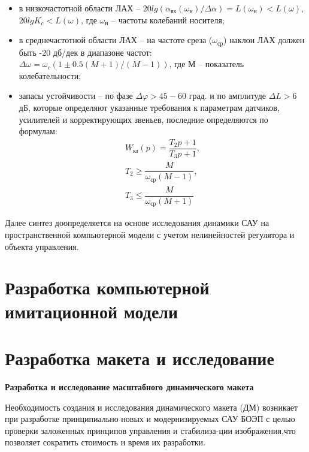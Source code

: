\begin{itemize}
	\item в низкочастотной области ЛАХ – $20 lg(\alpha_{\textit{вх}}(\omega_{\textit{н}}) / \varDelta\alpha)=L(\omega_{\textit{н}})<L(\omega)$, 
	$20 lg K_c < L(\omega)$, где 
	$\omega_{\textit{н}}$ – частоты колебаний носителя;
	\item в среднечастотной области ЛАХ – на частоте среза ($\omega_{\textit{ср}}$) наклон ЛАХ должен быть -20 дб/дек в диапазоне частот: \\
	$\varDelta\omega = \omega_c ( 1 \pm 0.5(M + 1)/(M - 1) )$, где М – показатель колебательности;
	\item запасы устойчивости – 
	по фазе $\varDelta\varphi>45-60$ град. и 
	по амплитуде $\varDelta L>6$ дБ,
	которые определяют указанные требования к параметрам датчиков, усилителей и корректирующих звеньев, последние определяются по формулам:
	\begin{equation}
	\label{eq:p2:16-a2}
	\begin{alignedat}{2}
	W_{\textit{кз}}(p) = \dfrac{T_2p+1}{T_3p+1} ,\\
	T_2 \geq \dfrac{M}{\omega_{\textit{ср}}(M-1)} ,\\
	T_3 \leq \dfrac{M}{\omega_{\textit{ср}}(M+1)}
	\end{alignedat}
	\end{equation}
\end{itemize}

Далее синтез доопределяется на основе исследования динамики САУ на пространственной компьютерной модели \cite[]{Malivanov-a2-9} с учетом нелинейностей регулятора и объекта управления.

\section{Разработка компьютерной имитационной модели} \label{sec:ch2/sec7}

\section{Разработка макета и исследование } \label{sec:ch2/sec8}

\textbf{Разработка и исследование масштабного динамического макета}

Необходимость создания и исследования динамического макета (ДМ) возникает при разработке принципиально новых и модернизируемых САУ БОЭП с целью проверки заложенных принципов управления и стабилиза-ции изображения,что позволяет сократить стоимость и время их разработки. 

